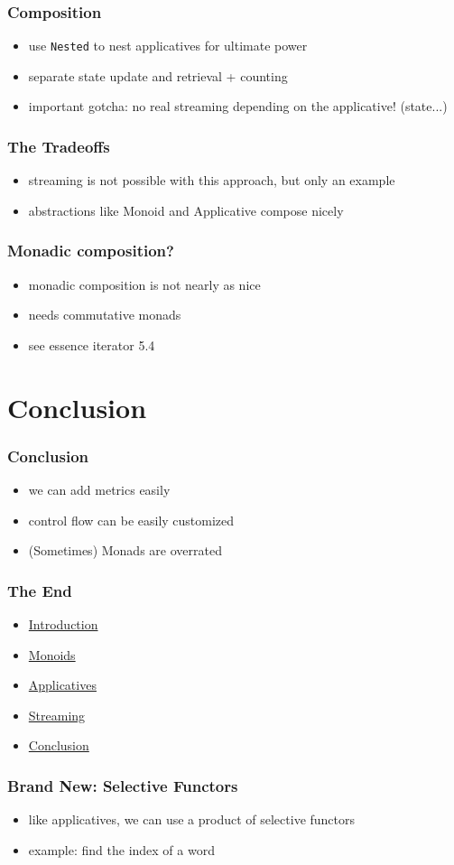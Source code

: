 \documentclass[aspectratio=169]{beamer}
\begin{document}
\begin{frame}
  \frametitle{Composition}
  \begin{itemize}
  \item use \texttt{Nested} to nest applicatives for ultimate power
  \item separate state update and retrieval + counting
  \item important gotcha: no real streaming depending on the applicative! (state...)
  \end{itemize}
\end{frame}

\begin{frame}
  \frametitle{The Tradeoffs}
  \begin{itemize}
  \item streaming is not possible with this approach, but only an example
  \item abstractions like Monoid and Applicative compose nicely
  \end{itemize}
\end{frame}

\begin{frame}
  \frametitle{Monadic composition?}
  \begin{itemize}
  \item monadic composition is not nearly as nice
  \item needs commutative monads
  \item see essence iterator 5.4
  \end{itemize}
\end{frame}

\section{Conclusion}\label{sec:conclusion}

\begin{frame}
  \frametitle{Conclusion}
  \begin{itemize}
  \item we can add metrics easily
  \item control flow can be easily customized
  \item (Sometimes) Monads are overrated
  \end{itemize}
\end{frame}

\begin{frame}
  \frametitle{The End}
  \begin{itemize}
  \item \hyperref[sec:introduction]{Introduction}
  \item \hyperref[sec:monoids]{Monoids}
  \item \hyperref[sec:applicatives]{Applicatives}
  \item \hyperref[sec:streaming]{Streaming}
  \item \hyperref[sec:conclusion]{Conclusion}
  \end{itemize}
\end{frame}

\appendix{}

\begin{frame}
  \frametitle{Brand New: Selective Functors}
  \begin{itemize}
  \item like applicatives, we can use a product of selective functors
  \item example: find the index of a word
  \end{itemize}
\end{frame}
\end{document}
